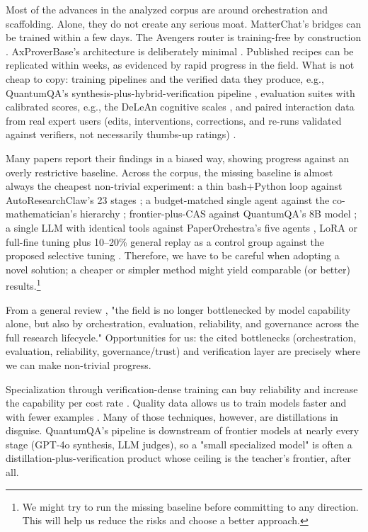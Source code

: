 Most of the advances in the analyzed corpus are around orchestration and scaffolding.
Alone, they do not create any serious moat.
MatterChat's \cite{Tang2026} bridges can be trained within a few days.
The Avengers router is training-free by construction \cite{2505.19797}. AxProverBase's architecture is deliberately minimal \cite{2602.24273}. Published recipes can be replicated within weeks, as evidenced by rapid progress in the field. What is not cheap to copy: training pipelines and the verified data they produce, e.g., QuantumQA's synthesis-plus-hybrid-verification pipeline \cite{2604.18176}, evaluation suites with calibrated scores, e.g., the DeLeAn cognitive scales \cite{Zhou2026}, and paired interaction data from real expert users (edits, interventions, corrections, and re-runs validated against verifiers, not necessarily thumbs-up ratings) \cite{2601.05280}.

Many papers report their findings in a biased way, showing progress against an overly restrictive baseline. Across the corpus, the missing baseline is almost always the cheapest non-trivial experiment: a thin bash+Python loop against AutoResearchClaw's 23 stages \cite{2605.20025}; a budget-matched single agent against the co-mathematician's hierarchy \cite{2605.06651}; frontier-plus-CAS against QuantumQA's 8B model \cite{2604.18176}; a single LLM with identical tools against PaperOrchestra's five agents \cite{2604.05018}, LoRA or full-fine tuning plus 10–20\% general replay as a control group against the proposed selective tuning \cite{2510.08564}. Therefore, we have to be careful when adopting a novel solution; a cheaper or simpler method might yield comparable (or better) results.\footnote{%
    We might try to run the missing baseline before committing to any direction. This will help us reduce the risks and choose a better approach.
}

From a general review \cite{2605.18661}, "the field is no longer bottlenecked by model capability alone, but also by orchestration, evaluation, reliability, and governance across the full research lifecycle."
Opportunities for us: the cited bottlenecks (orchestration, evaluation, reliability, governance/trust) and verification layer are precisely where we can make non-trivial progress. 

Specialization through verification-dense training can buy reliability and increase the capability per cost rate \cite{2604.18176}. Quality data allows us to train models faster and with fewer examples \cite{2510.03313}. Many of those techniques, however, are distillations in disguise. QuantumQA's pipeline is downstream of frontier models at nearly every stage (GPT-4o synthesis, LLM judges), so a "small specialized model" is often a distillation-plus-verification product whose ceiling is the teacher's frontier, after all.

